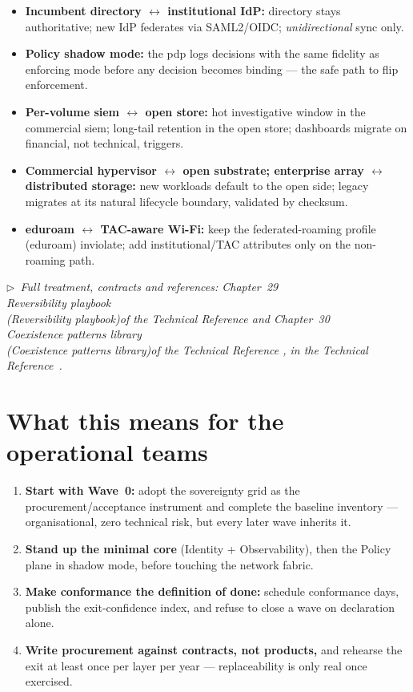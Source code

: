\documentclass[11pt,a4paper,twoside]{article}
\newcommand{\trchap}[2]{%
  Chapter~#1%
  \ifx\\#2\\\else\space(\emph{#2})\fi\space of the Technical Reference%
}
\newcommand{\mainref}[1]{%
  \par\vspace{1pt}
  {\footnotesize\color{gray}\itshape
  $\triangleright$~Full treatment, contracts and references: #1,
  in the Technical Reference~\cite{ng-tech-ref-2026}.}\par\vspace{2pt}}
\begin{document}
\begin{principlebox}
\begin{itemize}[nosep,leftmargin=1.2em]
  \item \textbf{Incumbent directory $\leftrightarrow$ institutional IdP:}
    directory stays authoritative; new IdP federates via SAML2/OIDC;
    \emph{unidirectional} sync only.
  \item \textbf{Policy shadow mode:} the \gls{pdp} logs decisions with the
    same fidelity as enforcing mode before any decision becomes binding ---
    the safe path to flip enforcement.
  \item \textbf{Per-volume \gls{siem} $\leftrightarrow$ open store:} hot
    investigative window in the commercial \gls{siem}; long-tail retention in
    the open store; dashboards migrate on financial, not technical, triggers.
  \item \textbf{Commercial hypervisor $\leftrightarrow$ open substrate;
    enterprise array $\leftrightarrow$ distributed storage:} new workloads
    default to the open side; legacy migrates at its natural lifecycle
    boundary, validated by checksum.
  \item \textbf{eduroam $\leftrightarrow$ TAC-aware Wi-Fi:} keep the federated-roaming
    profile (eduroam) inviolate; add institutional/TAC attributes only on
    the non-roaming path.
\end{itemize}
\end{principlebox}

\mainref{\trchap{29}{Reversibility playbook} and
\trchap{30}{Coexistence patterns library}}

\section{What this means for the operational teams}

\begin{actionbox}
\begin{enumerate}[leftmargin=1.5em]
  \item \textbf{Start with Wave~0:} adopt the sovereignty grid as the
    procurement/acceptance instrument and complete the baseline inventory ---
    organisational, zero technical risk, but every later wave inherits it.
  \item \textbf{Stand up the minimal core} (Identity + Observability), then
    the Policy plane in shadow mode, before touching the network fabric.
  \item \textbf{Make conformance the definition of done:} schedule
    conformance days, publish the exit-confidence index, and refuse to close
    a wave on declaration alone.
  \item \textbf{Write procurement against contracts, not products,} and
    rehearse the exit at least once per layer per year --- replaceability is
    only real once exercised.
\end{enumerate}
\end{actionbox}
\end{document}
